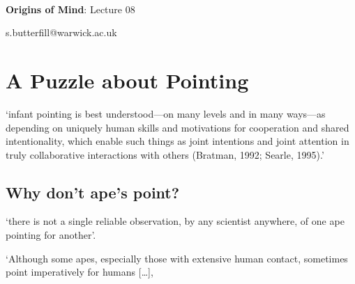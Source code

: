 \documentclass[12pt]{extarticle}
\date{}
\makeatletter
\def \ititle {Origins of Mind}
\def \isubtitle {Lecture 08}
\def \iemail{s.butterfill@warwick.ac.uk}
\makeatother
\begin{document}
\begin{multicols}{3}

\setlength\footnotesep{1em}










\def \ititle {Origins of Mind}
 
\def \isubtitle {Lecture 08}
 
 
 
\
 
 
 
\begin{center}
 
{\Large
 
\textbf{\ititle}: \isubtitle
 
}
 
 
 
\iemail %
 
\end{center}
 
 
 
\section{A Puzzle about Pointing}
 
‘infant pointing is best understood---on many levels and in many ways---as depending on uniquely human skills and motivations for cooperation and shared intentionality, which enable such things as joint intentions and joint attention in truly collaborative interactions with others (Bratman, 1992; Searle, 1995).’
\citep[p.\ 706]{Tomasello:2007fi}
 
\subsection{Why don’t ape’s point?}
 
‘there is not a single reliable observation, by any scientist anywhere, of one ape pointing for another’.
\citep[p.\ 507]{Tomasello:2010dy}
 
‘Although some apes, especially those with extensive human contact, sometimes point imperatively for humans […],
 

\end{multicols}
\end{document}
